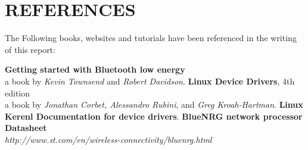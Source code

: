 \chapter{REFERENCES}
The Following books, websites and tutorials have been referenced in the writing of this report:
\begin{thebibliography}{9}
	\textbf{Getting started with Bluetooth low energy}\\
		a book by \textit{Kevin Townsend} and \textit{Robert Davidson}.
	\textbf{Linux Device Drivers}, 4th edition\\
		a book by \textit{Jonathan Corbet, Alessandro Rubini}, and \textit{Greg Kroah-Hartman}.
	\textbf{Linux Kerenl Documentation for device drivers}.
	\textbf{BlueNRG network processor Datasheet}\\
		\textit{http://www.st.com/en/wireless-connectivity/bluenrg.html}
\end{thebibliography}
